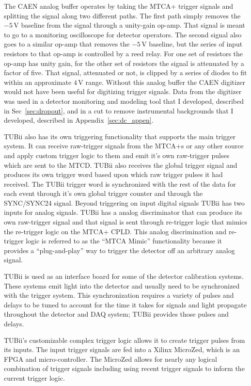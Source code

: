 The CAEN analog buffer operates
by taking the MTCA+ trigger signals and splitting
the signal along two different paths.
The first path simply removes the $-5$\,V baseline from the signal
through a unity-gain op-amp.
That signal is meant to go to a monitoring oscilloscope for detector
operators.
The second signal also goes to a similar op-amp that removes the
$-5$\,V baseline, but the series of input resistors to that op-amp
is controlled by a reed relay.
For one set of resistors the op-amp has unity gain, for the other set
of resistors the signal is attenuated by a factor of five.
That signal, attenuated or not, is clipped by a series of diodes to fit
within an approximate $4$\,V range.
Without this analog buffer the CAEN digitizer would not have been
useful for digitizing trigger signals.
Data from the digitizer was used in a detector monitoring and modeling
tool that I developed, described in Sec~\ref{sec:dropout}, and in
a cut to remove instrumental backgrounds that I developed, described in Appendix~\ref{sec:dc_appen}.

TUBii also has its own triggering functionality that supports the main
trigger system.
It can receive raw-trigger signals from the MTCA+s 
or any other source and
apply custom trigger logic to them and emit it's own raw-trigger pulses which are
sent to the MTCD\@.
TUBii also receives the global trigger signal and produces its own trigger
word based upon which raw trigger pulses it had received. The TUBii trigger
word is synchronized with the rest of the data for each event through it's own
global trigger counter and through the SYNC/SYNC24 signal.
Beyond triggering on input digital signals TUBii has two inputs for analog
signals.
TUBii has a analog discriminator that can produce its own raw-trigger signal
and that signal is sent through re-trigger logic that mimics the re-trigger
logic on the MTCA+ CPLD\@.
This analog discrimination and re-trigger logic is referred to as the ``MTCA
Mimic'' functionality because it provides a ``plug-and-play'' 
way to trigger the detector off an arbitrary analog signal.

TUBii is used as an interface board for some of the detector calibration systems.
These systems emit light into the detector and usually need to be
synchronized with the trigger system. This synchronization requires
a variety of pulses and delays to be tuned to account for the time it
takes for signals and light propagate throughout the detector and DAQ
system; TUBii provides those pulses and delays.

TUBii's customizable complex trigger logic
allows it to create trigger pulses from its inputs.
The input trigger signals are fed into a Xilinx MicroZed, which is an FPGA and
micro-controller.
The MicroZed allows for nearly any logical combination of trigger signals including
using recent trigger signals to inform the current trigger logic.

